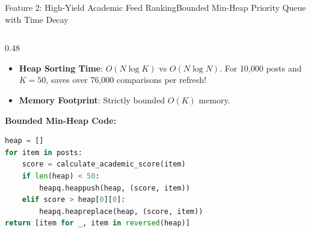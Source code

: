 \documentclass[aspectratio=169,10pt]{beamer}
\begin{document}
\begin{frame}[fragile,t]{Feature 2: High-Yield Academic Feed Ranking}{Bounded Min-Heap Priority Queue with Time Decay}
\begin{columns}[t]
\begin{column}{0.48\textwidth}
      \begin{itemize}\setlength{\itemsep}{1.2pt}
        \item {\fontsize{8.0}{9.8}\selectfont \textbf{Heap Sorting Time}: $O(N \log K)$ vs $O(N \log N)$. For 10,000 posts and $K=50$, saves over 76,000 comparisons per refresh!}
        \item {\fontsize{8.0}{9.8}\selectfont \textbf{Memory Footprint}: Strictly bounded $O(K)$ memory.}
      \end{itemize}
      \vspace{0.1cm}
      {\fontsize{8.0}{10.0}\selectfont\textbf{\textcolor{KoinexaRed}{Bounded Min-Heap Code:}}}
\begin{lstlisting}[language=Python]
heap = []
for item in posts:
    score = calculate_academic_score(item)
    if len(heap) < 50:
        heapq.heappush(heap, (score, item))
    elif score > heap[0][0]:
        heapq.heapreplace(heap, (score, item))
return [item for _, item in reversed(heap)]
\end{lstlisting}
    \end{column}
  \end{columns}
\end{frame}
\end{document}
